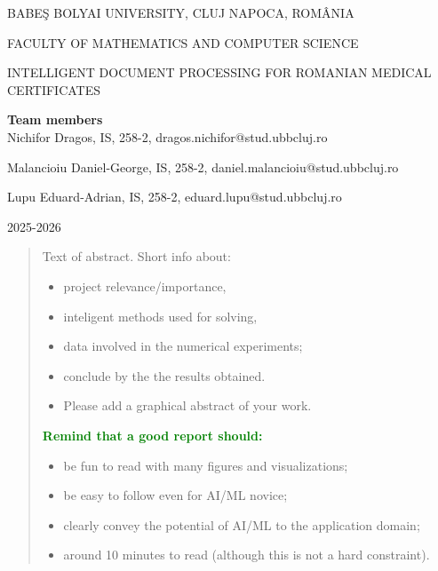 \documentclass[runningheads,a4paper,11pt]{report}
\begin{document}
\begin{titlepage}
\sloppy

\begin{center}
BABE\c S BOLYAI UNIVERSITY, CLUJ NAPOCA, ROM\^ ANIA

FACULTY OF MATHEMATICS AND COMPUTER SCIENCE

\vspace{6cm}

\Huge \textbf{}

\vspace{1cm}

\normalsize INTELLIGENT DOCUMENT PROCESSING FOR ROMANIAN MEDICAL CERTIFICATES

\end{center}


\vspace{5cm}

\begin{flushright}
\Large{\textbf{Team members}}\\
Nichifor Dragos, IS, 258-2, dragos.nichifor@stud.ubbcluj.ro

Malancioiu Daniel-George, IS, 258-2, daniel.malancioiu@stud.ubbcluj.ro

Lupu Eduard-Adrian, IS, 258-2, eduard.lupu@stud.ubbcluj.ro
\end{flushright}

\vspace{4cm}

\begin{center}
2025-2026
\end{center}

\end{titlepage}


\begin{abstract}
	Text of abstract. Short info about:
	\begin{itemize}
		\item project relevance/importance,
		\item inteligent methods used for solving,
		\item data involved in the numerical experiments;
		\item conclude by the the results obtained.
		\item Please add a graphical abstract of your work.
	\end{itemize}



\noindent
\textbf{\textcolor{green}{Remind that a good report should:}}
\begin{itemize}
	\item be fun to read with many figures and visualizations;
	\item be easy to follow even for AI/ML novice;
	\item clearly convey the potential of AI/ML to the application domain;
	\item around 10 minutes to read (although this is not a hard constraint).
\end{itemize}

\end{abstract}
\end{document}

